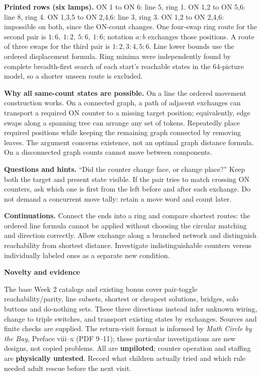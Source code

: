 \documentclass[11pt]{article}
\newcommand\lead[1]{\textbf{#1}\par}
\begin{document}
\textbf{Printed rows (six lamps).} ON 1 to ON 6: line 5, ring 1. ON 1,2 to ON 5,6: line 8, ring 4. ON 1,3,5 to ON 2,4,6: line 3, ring 3. ON 1,2 to ON 2,4,6: impossible on both, since the ON-count changes. One four-swap ring route for the second pair is $1\!:\!6,\ 1\!:\!2,\ 5\!:\!6,\ 1\!:\!6$; notation $a:b$ exchanges those positions. A route of three swaps for the third pair is $1:2,3:4,5:6$. Line lower bounds use the ordered displacement formula. Ring minima were independently found by complete breadth-first search of each start's reachable states in the 64-picture model, so a shorter unseen route is excluded.

\textbf{Why all same-count states are possible.} On a line the ordered movement construction works. On a connected graph, a path of adjacent exchanges can transport a required ON counter to a missing target position; equivalently, edge swaps along a spanning tree can arrange any set of tokens. Repeatedly place required positions while keeping the remaining graph connected by removing leaves. The argument concerns existence, not an optimal graph distance formula. On a disconnected graph counts cannot move between components.

\textbf{Questions and hints.} ``Did the counter change face, or change place?'' Keep both the target and present state visible. If the pair tries to match crossing ON counters, ask which one is first from the left before and after each exchange. Do not demand a concurrent move tally: retain a move word and count later.

\textbf{Continuations.} Connect the ends into a ring and compare shortest routes: the ordered line formula cannot be applied without choosing the circular matching and direction correctly. Allow exchange along a branched network and distinguish reachability from shortest distance. Investigate indistinguishable counters versus individually labeled ones as a separate new condition.

\lead{Novelty and evidence}
The base Week 2 catalogs and existing bonus cover pair-toggle reachability/parity, line subsets, shortest or cheapest solutions, bridges, solo buttons and do-nothing sets. These three directions instead infer unknown wiring, change to triple switches, and transport existing states by exchanges. Sources and finite checks are supplied. The return-visit format is informed by \emph{Math Circle by the Bay}, Preface viii--x (PDF 9--11); these particular investigations are new designs, not copied problems. All are \textbf{unpiloted}; counter operation and staffing are \textbf{physically untested}. Record what children actually tried and which rule needed adult rescue before the next visit.
\end{document}
